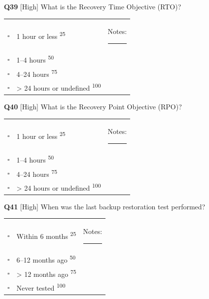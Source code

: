 \documentclass[11pt,landscape]{article}
\begin{document}
\noindent\colorbox{highbg}{\textbf{Q39} [High]} What is the Recovery Time Objective (RTO)?

\begin{tabularx}{\textwidth}{cXX}
$\square$ & 1 hour or less \textsuperscript{\scriptsize\textcolor{stridegray}{25}} & Notes: \rule{4cm}{0.4pt} \\
$\square$ & 1--4 hours \textsuperscript{\scriptsize\textcolor{stridegray}{50}} &  \\
$\square$ & 4--24 hours \textsuperscript{\scriptsize\textcolor{stridegray}{75}} &  \\
$\square$ & > 24 hours or undefined \textsuperscript{\scriptsize\textcolor{stridegray}{100}} &  \\
\end{tabularx}

\vspace{0.3cm}

\noindent\colorbox{highbg}{\textbf{Q40} [High]} What is the Recovery Point Objective (RPO)?

\begin{tabularx}{\textwidth}{cXX}
$\square$ & 1 hour or less \textsuperscript{\scriptsize\textcolor{stridegray}{25}} & Notes: \rule{4cm}{0.4pt} \\
$\square$ & 1--4 hours \textsuperscript{\scriptsize\textcolor{stridegray}{50}} &  \\
$\square$ & 4--24 hours \textsuperscript{\scriptsize\textcolor{stridegray}{75}} &  \\
$\square$ & > 24 hours or undefined \textsuperscript{\scriptsize\textcolor{stridegray}{100}} &  \\
\end{tabularx}

\vspace{0.3cm}

\noindent\colorbox{highbg}{\textbf{Q41} [High]} When was the last backup restoration test performed?

\begin{tabularx}{\textwidth}{cXX}
$\square$ & Within 6 months \textsuperscript{\scriptsize\textcolor{stridegray}{25}} & Notes: \rule{4cm}{0.4pt} \\
$\square$ & 6--12 months ago \textsuperscript{\scriptsize\textcolor{stridegray}{50}} &  \\
$\square$ & > 12 months ago \textsuperscript{\scriptsize\textcolor{stridegray}{75}} &  \\
$\square$ & Never tested \textsuperscript{\scriptsize\textcolor{stridegray}{100}} &  \\
\end{tabularx}
\end{document}

